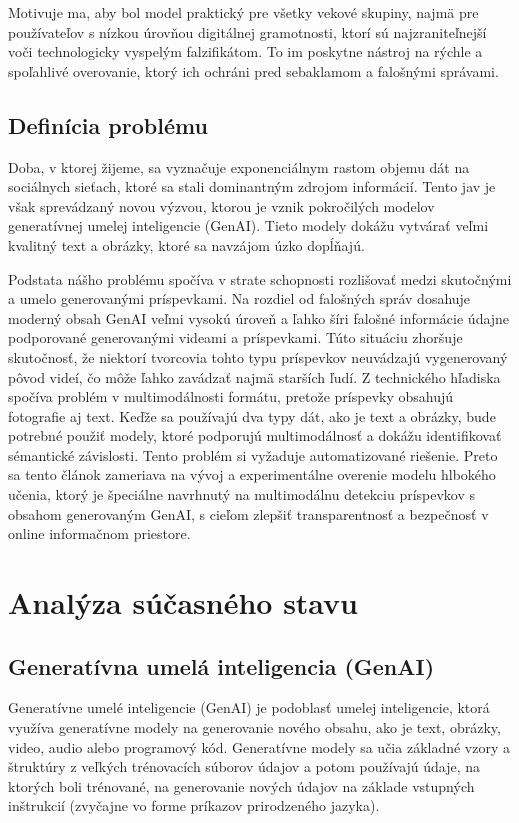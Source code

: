 \documentclass[]{tukediphc}
\begin{document}
Motivuje ma, aby bol model praktický pre všetky vekové skupiny, najmä pre používateľov s nízkou úrovňou digitálnej gramotnosti, ktorí sú najzraniteľnejší voči technologicky vyspelým falzifikátom. To im poskytne nástroj na rýchle a spoľahlivé overovanie, ktorý ich ochráni pred sebaklamom a falošnými správami.





\subsection{Definícia problému}
Doba, v ktorej žijeme, sa vyznačuje exponenciálnym rastom objemu dát na sociálnych sieťach, ktoré sa stali dominantným zdrojom informácií. Tento jav je však sprevádzaný novou výzvou, ktorou je vznik pokročilých modelov generatívnej umelej inteligencie (GenAI). Tieto modely dokážu vytvárať veľmi kvalitný text a obrázky, ktoré sa navzájom úzko dopĺňajú. 

Podstata nášho problému spočíva v strate schopnosti rozlišovať medzi skutočnými a umelo generovanými príspevkami. Na rozdiel od falošných správ dosahuje moderný obsah GenAI veľmi vysokú úroveň a ľahko šíri falošné informácie údajne podporované generovanými videami a príspevkami. Túto situáciu zhoršuje skutočnosť, že niektorí tvorcovia tohto typu príspevkov neuvádzajú vygenerovaný pôvod videí, čo môže ľahko zavádzať najmä starších ľudí. Z technického hľadiska spočíva problém v multimodálnosti formátu, pretože príspevky obsahujú fotografie aj text. Keďže sa používajú dva typy dát, ako je text a obrázky, bude potrebné použiť modely, ktoré podporujú multimodálnosť a dokážu identifikovať sémantické závislosti. Tento problém si vyžaduje automatizované riešenie. Preto sa tento článok zameriava na vývoj a experimentálne overenie modelu hlbokého učenia, ktorý je špeciálne navrhnutý na multimodálnu detekciu príspevkov s obsahom generovaným GenAI, s cieľom zlepšiť transparentnosť a bezpečnosť v online informačnom priestore.

\section{Analýza súčasného stavu}

\subsection{Generatívna umelá inteligencia (GenAI)}
Generatívne umelé inteligencie (GenAI) je podoblasť umelej inteligencie, ktorá využíva generatívne modely na generovanie nového obsahu, ako je text, obrázky, video, audio alebo programový kód. Generatívne modely sa učia základné vzory a štruktúry z veľkých trénovacích súborov údajov a potom používajú údaje, na ktorých boli trénované, na generovanie nových údajov na základe vstupných inštrukcií (zvyčajne vo forme príkazov prirodzeného jazyka). 
\end{document}
